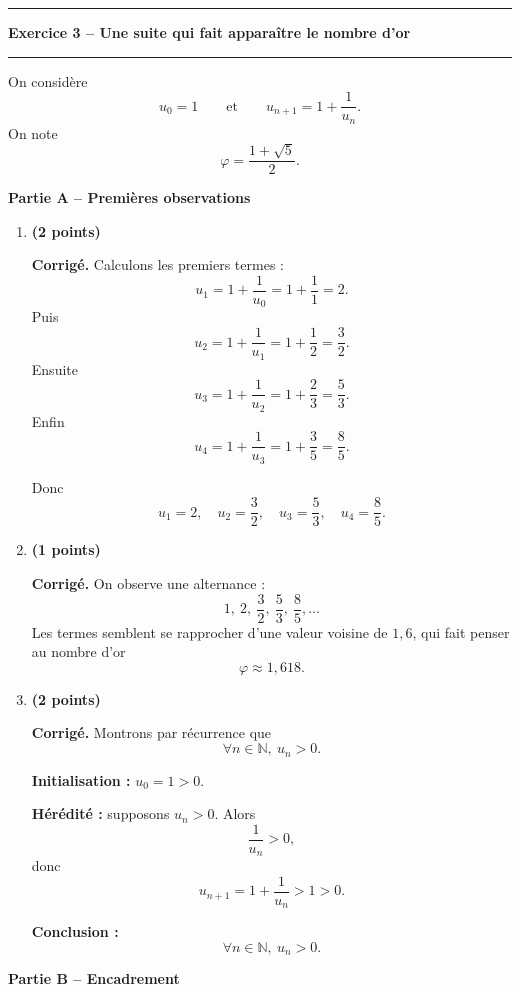 \documentclass[11pt,a4paper]{article}
\newcommand{\N}{\mathbb{N}}
\newcommand{\bareme}[1]{\hfill{\color{blue!70!black}\textbf{(#1 points)}}}
\newcommand{\corr}{\noindent\textcolor{blue!70!black}{\textbf{Corrigé. }}}
\begin{document}
\vspace{0.4cm}

\hrule
\vspace{0.4cm}
\begin{center}
    \textbf{\large Exercice 3 -- Une suite qui fait apparaître le nombre d’or}
\end{center}
\vspace{0.2cm}
\hrule
\vspace{0.3cm}

On considère
\[
u_0=1
\qquad \text{et} \qquad
u_{n+1}=1+\frac{1}{u_n}.
\]
On note
\[
\varphi=\frac{1+\sqrt5}{2}.
\]

\medskip

\textbf{Partie A -- Premières observations}

\begin{enumerate}[label=\textbf{A.\arabic*.}, leftmargin=0.9cm]

\item \bareme{2}

\corr Calculons les premiers termes :
\[
u_1=1+\frac1{u_0}=1+\frac11=2.
\]
Puis
\[
u_2=1+\frac1{u_1}=1+\frac12=\frac32.
\]
Ensuite
\[
u_3=1+\frac1{u_2}=1+\frac{2}{3}=\frac53.
\]
Enfin
\[
u_4=1+\frac1{u_3}=1+\frac35=\frac85.
\]

Donc
\[
\boxed{u_1=2,\quad u_2=\frac32,\quad u_3=\frac53,\quad u_4=\frac85.}
\]

\item \bareme{1}

\corr On observe une alternance :
\[
1,\ 2,\ \frac32,\ \frac53,\ \frac85,\dots
\]
Les termes semblent se rapprocher d’une valeur voisine de $1{,}6$, qui fait penser au nombre d’or
\[
\varphi\approx 1{,}618.
\]

\item \bareme{2}

\corr Montrons par récurrence que
\[
\forall n\in\N,\ u_n>0.
\]

\textbf{Initialisation :} $u_0=1>0$.

\textbf{Hérédité :} supposons $u_n>0$. Alors
\[
\frac1{u_n}>0,
\]
donc
\[
u_{n+1}=1+\frac1{u_n}>1>0.
\]

\textbf{Conclusion :}
\[
\boxed{\forall n\in\N,\ u_n>0.}
\]

\end{enumerate}

\medskip

\textbf{Partie B -- Encadrement}
\end{document}
